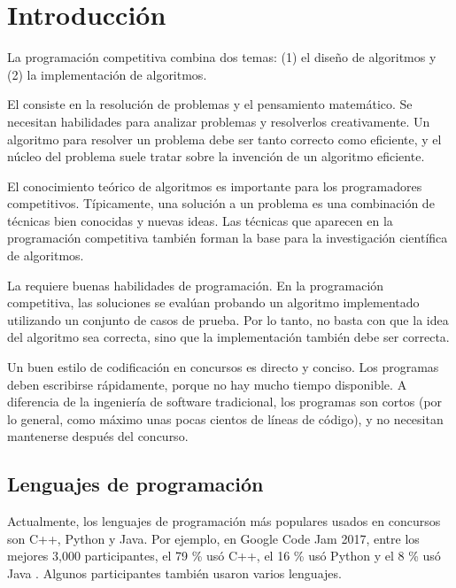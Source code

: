 \chapter{Introducci\'on}

La programaci\'on competitiva combina dos temas:
(1) el diseño de algoritmos y (2) la implementaci\'on de algoritmos.

El  consiste en la resoluci\'on de problemas
y el pensamiento matem\'atico.
Se necesitan habilidades para analizar problemas y resolverlos
creativamente.
Un algoritmo para resolver un problema
debe ser tanto correcto como eficiente,
y el n\'ucleo del problema suele
tratar sobre la invenci\'on de un algoritmo eficiente.

El conocimiento te\'orico de algoritmos
es importante para los programadores competitivos.
T\'ipicamente, una soluci\'on a un problema es
una combinaci\'on de t\'ecnicas bien conocidas y
nuevas ideas.
Las t\'ecnicas que aparecen en la programaci\'on competitiva
tambi\'en forman la base para la investigaci\'on cient\'ifica
de algoritmos.

La  requiere buenas
habilidades de programaci\'on.
En la programaci\'on competitiva, las soluciones
se eval\'uan probando un algoritmo implementado
utilizando un conjunto de casos de prueba.
Por lo tanto, no basta con que la idea del
algoritmo sea correcta, sino que la implementaci\'on tambi\'en
debe ser correcta.

Un buen estilo de codificaci\'on en concursos es
directo y conciso.
Los programas deben escribirse r\'apidamente,
porque no hay mucho tiempo disponible.
A diferencia de la ingenier\'ia de software tradicional,
los programas son cortos (por lo general, como m\'aximo unas pocas
cientos de l\'ineas de c\'odigo), y no necesitan
mantenerse despu\'es del concurso.

\section{Lenguajes de programaci\'on}


Actualmente, los lenguajes de programaci\'on m\'as populares
usados en concursos son C++, Python y Java.
Por ejemplo, en Google Code Jam 2017,
entre los mejores 3,000 participantes,
el 79 \% us\'o C++,
el 16 \% us\'o Python y
el 8 \% us\'o Java \cite{goo17}.
Algunos participantes tambi\'en usaron varios lenguajes.

